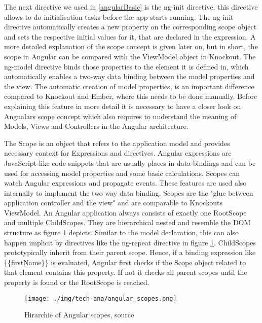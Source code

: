 The next directive we used in \ref{angularBasic} is the ng-init directive.
this directive allows to do initialisation tasks before the app starts running.
The ng-init directive automatically creates a new property on the corresponding scope object and sets the respective initial values for it, that are declared in the expression. A more detailed explanation of the scope concept is given later on, but in short, the scope in Angular can be compared with the ViewModel object in Knockout.
The ng-model directive binds those properties to the element it is defined in, which automatically enables a two-way data binding between the model properties and the view.
The automatic creation of model properties, is an important difference compared to Knockout and Ember, where this needs to be done manually.  
Before explaining this feature in more detail it is necessary to have a closer look on Angualars scope concept which also requires to understand the meaning of Models, Views and Controllers in the Angular architecture.

The Scope is an object that refers to the application model and provides necessary context for Expressions  and directives.
Angular expressions are JavaScript-like code snippets that are usually places in data-bindings and can be used for accessing model properties and some basic calculations.
Scopes can watch Angular expressions and propagate events.
These features are used also internally to implement the two way data binding.
Scopes are the "glue between application controller and the view" \autocite{tech-ana:ng-scope}  and are comparable to Knockouts ViewModel.
An Angular application always consists of exactly one RootScope and multiple ChildScopes.
They are hierarchical nested and resemble the DOM structure as figure \ref{fig:angular_scopes} depicts.
Similar to the model declaration, this can also happen implicit by directives like the ng-repeat directive in figure \ref{fig:angular_scopes}.
ChildScopes prototypically inherit from their parent scope.
Hence, if a binding expression like \{\{firstName\}\} is evaluated, Angular first checks if the Scope object related to that element contains this property.
If not it checks all parent scopes until the property is found or the RootScope is reached.

\begin{figure}
	\centering	
	\texttt{[image: ./img/tech-ana/angular\_scopes.png]}
	\caption{Hirarchie of Angular scopes, source \autocite{tech-ana:ng-scope}}
	\label{fig:angular_scopes}
\end{figure} 

